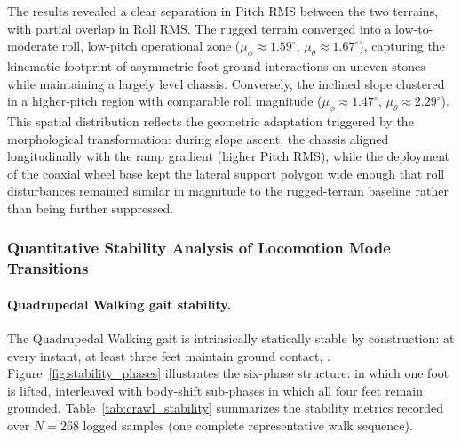  The results revealed a clear separation in Pitch RMS between the two terrains, with partial overlap in Roll RMS. The rugged terrain converged into a low-to-moderate roll, low-pitch operational zone ($\mu_{\phi} \approx 1.59^{\circ}$, $\mu_{\theta} \approx 1.67^{\circ}$), capturing the kinematic footprint of asymmetric foot-ground interactions on uneven stones while maintaining a largely level chassis. Conversely, the inclined slope clustered in a higher-pitch region with comparable roll magnitude ($\mu_{\phi} \approx 1.47^{\circ}$, $\mu_{\theta} \approx 2.29^{\circ}$). This spatial distribution reflects the geometric adaptation triggered by the morphological transformation: during slope ascent, the chassis aligned longitudinally with the ramp gradient (higher Pitch RMS), while the deployment of the coaxial wheel base kept the lateral support polygon wide enough that roll disturbances remained similar in magnitude to the rugged-terrain baseline rather than being further suppressed. 

\subsubsection{Quantitative Stability Analysis of Locomotion Mode Transitions}
\label{sssec:transition_stability}

%


\paragraph{Quadrupedal Walking gait stability.}

%
The Quadrupedal Walking gait is intrinsically
statically stable by construction: at every instant, at least three feet
maintain ground contact, .
Figure~\ref{fig:stability_phases} illustrates the six-phase
structure:  in which one foot is
lifted, interleaved with  body-shift sub-phases in which all four
feet remain grounded.
Table~\ref{tab:crawl_stability} summarizes the stability metrics
recorded over $N = 268$ logged samples (one complete representative
walk sequence).


